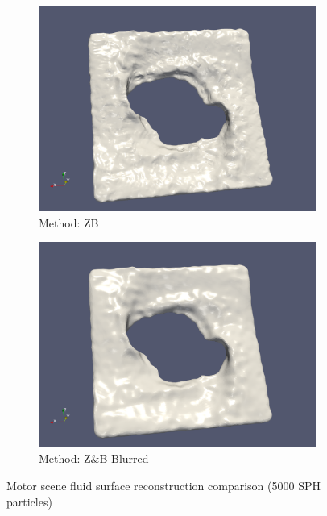  \begin{figure}
	\begin{center}
        \begin{subfigure}[b]{1\textwidth}
               \includegraphics[width=\textwidth]{figures/ReconstructionMotorSceneZhuBridson.png}
				\caption{Method: ZB}
        \end{subfigure}
       \begin{subfigure}[b]{1\textwidth}
               \includegraphics[width=\textwidth]{figures/ReconstructionMotorSceneZhuBridsonBlur.png}
				\caption{Method: Z\&B Blurred}
        \end{subfigure}
        \caption{Motor scene fluid surface reconstruction comparison (5000 SPH particles)}
        \label{fig:MotorScene2}
	\end{center}
\end{figure}
